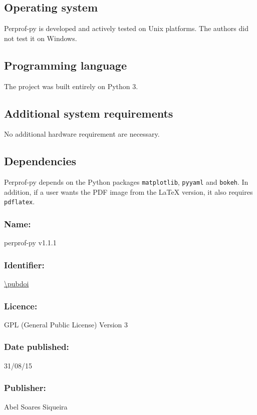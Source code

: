 \subsection*{Operating system}

    Perprof-py is developed and actively tested on Unix platforms.
    The authors did not test it on Windows.

\subsection*{Programming language}

    The project was built entirely on Python 3.

\subsection*{Additional system requirements}

    No additional hardware requirement are necessary.

\subsection*{Dependencies}

    Perprof-py depends on the Python packages \texttt{matplotlib}, \texttt{pyyaml} and \texttt{bokeh}.
    In addition, if a user wants the PDF image from the LaTeX
    version, it also requires \texttt{pdflatex}.

\Archive

    \subsubsection*{Name:} perprof-py v1.1.1

    \subsubsection*{Identifier:} \url{\pubdoi}

    \subsubsection*{Licence:} GPL (General Public License) Version 3

    \subsubsection*{Date published:} 31/08/15

    \subsubsection*{Publisher:} Abel Soares Siqueira

